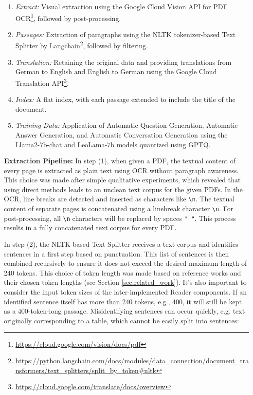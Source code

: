 \begin{enumerate}
    \item \textit{Extract:} Visual extraction using the Google Cloud Vision API for PDF OCR\footnote{\url{https://cloud.google.com/vision/docs/pdf}}, followed by post-processing.
    \item \textit{Passages:} Extraction of paragraphs using the NLTK tokenizer-based Text Splitter by Langchain\footnote{\url{https://python.langchain.com/docs/modules/data\_connection/document\_transformers/text\_splitters/split\_by\_token\#nltk}}, followed by filtering.
    \item \textit{Translation:} Retaining the original data and providing translations from German to English and English to German using the Google Cloud Translation API\footnote{\url{https://cloud.google.com/translate/docs/overview}}.
    \item \textit{Index:} A flat index, with each passage extended to include the title of the document.
    \item \textit{Training Data:} Application of Automatic Question Generation, Automatic Answer Generation, and Automatic Conversation Generation using the Llama2-7b-chat and LeoLama-7b models quantized using GPTQ.
\end{enumerate}

\textbf{Extraction Pipeline:} In step (1), when given a PDF, the textual content of every page is extracted as plain text using OCR without paragraph awareness. This choice was made after simple qualitative experiments, which revealed that using direct methods leads to an unclean text corpus for the given PDFs. In the OCR, line breaks are detected and inserted as characters like \texttt{\textbackslash n}. The textual content of separate pages is concatenated using a linebreak character \texttt{\textbackslash n}. For post-processing, all \texttt{\textbackslash n} characters will be replaced by spaces \texttt{" "}. This process results in a fully concatenated text corpus for every PDF.

In step (2), the NLTK-based Text Splitter receives a text corpus and identifies sentences in a first step based on punctuation. This list of sentences is then combined recursively to ensure it does not exceed the desired maximum length of 240 tokens. This choice of token length was made based on reference works and their chosen token lengths (see Section \ref{sec:related_work}). It's also important to consider the input token sizes of the later-implemented Reader components. If an identified sentence itself has more than 240 tokens, e.g., 400, it will still be kept as a 400-token-long passage. Misidentifying sentences can occur quickly, e.g. text originally corresponding to a table, which cannot be easily split into sentences:

